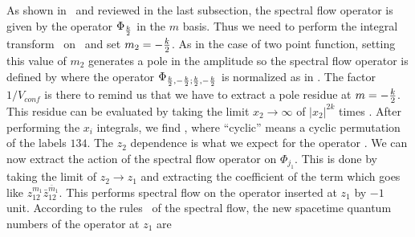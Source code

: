 As shown in \first\ and reviewed in the last subsection,
the spectral flow operator is given by the operator $\Phi_{{k\over
2}}$ in the $m$ basis. Thus we need to perform the integral
transform \basis\ on  \fpt\ and set $m_2 = -{k \over 2} $.
As in the case of two point function, setting this value
of $m_2$ generates a pole in the amplitude so
 the spectral flow operator is defined by
\eqn{}
where the operator  $ \Phi_{{k \over 2} ,- {k \over 2} ; {k \over 2},
-{k \over 2} }$ is normalized as in
\basis . The factor $1/V_{conf}$ is there to remind us
 that we have to extract a pole residue at $m = -
{k \over 2}$. This residue can be evaluated
by taking the limit $x_2 \to \infty $ of
$|x_2|^{2k}$ times \fpt . After performing the $x_i$ integrals,
we find  \zam ,
\eqn{}
 where ``cyclic'' means a cyclic permutation of the
labels $134$.
The $z_2$ dependence is what we expect for the operator \spectflow .
 We can now extract
the action of the spectral flow operator on $\Phi_{j_1}$.
This is done by taking
the limit of $z_2 \to z_1$ and extracting the coefficient of the term
which goes like $ z_{12}^{m_1} {\bar z}_{12}^{\bar m_1} $.
This performs spectral flow on the operator inserted at $z_1$ by $-1$
unit. According to the rules \sfagain\
of the spectral
flow, the new spacetime quantum numbers of the operator at $z_1$ are
